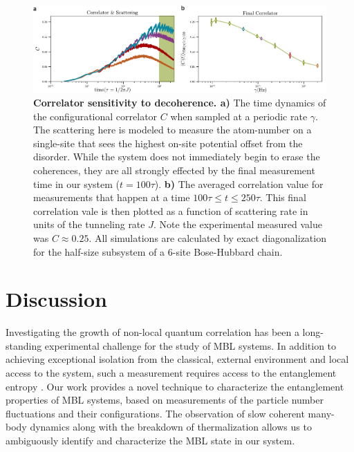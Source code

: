 \begin{figure}[t!]
		\includegraphics[width=\columnwidth]{figures/ch5/decoherePlot.pdf} 
		\caption{\textbf{Correlator sensitivity to decoherence. a)} The time dynamics of the configurational correlator $C$ when sampled at a periodic rate $\gamma$. The scattering here is modeled to measure the atom-number on a single-site that sees the highest on-site potential offset from the disorder. While the system does not immediately begin to erase the coherences, they are all strongly effected by the final measurement time in our system ($t=100\tau$). \textbf{b)} The averaged correlation value for measurements that happen at a time $100\tau \leq t \leq 250\tau$. This final correlation vale is then plotted as a function of scattering rate in units of the tunneling rate $J$. Note the experimental measured value was $C\approx0.25$. All simulations are calculated by exact diagonalization for the half-size subsystem of a $6$-site Bose-Hubbard chain.}
		\label{fig:MBLgamma}	
\end{figure}

\section{Discussion}

Investigating the growth of non-local quantum correlation has been a long-standing experimental challenge for the study of MBL systems. In addition to achieving exceptional isolation from the classical, external environment and local access to the system, such a measurement requires access to the entanglement entropy \cite{Bardarson2012,Nandkishore2015}. Our work provides a novel technique to characterize the entanglement properties of MBL systems, based on measurements of the particle number fluctuations and their configurations. The observation of slow coherent many-body dynamics along with the breakdown of thermalization allows us to ambiguously identify and characterize the MBL state in our system.

